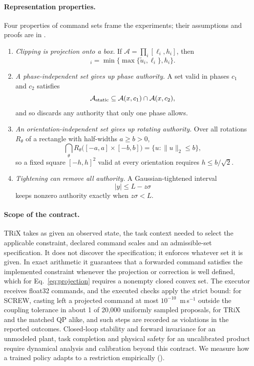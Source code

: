 \documentclass[12pt]{article}
\begin{document}
\paragraph{Representation properties.} Four properties of command sets frame
the experiments; their assumptions and proofs are in .
\begin{enumerate}[label=(\roman*),leftmargin=*,itemsep=2pt]
\item \emph{Clipping is projection onto a box.} If $\mathcal A=\prod_i[\ell_i,h_i]$, then
\begin{equation}
[\Pi_{\mathcal A}(\tilde u)]_i=\min\{\max\{\tilde u_i,\ell_i\},h_i\}.
\label{eq:clip}
\end{equation}
\item \emph{A phase-independent set gives up phase authority.} A set valid in
phases $c_1$ and $c_2$ satisfies
\begin{equation}
\mathcal A_{\rm static}\subseteq\mathcal A(x,c_1)\cap\mathcal A(x,c_2),
\label{eq:phase}
\end{equation}
and so discards any authority that only one phase allows.
\item \emph{An orientation-independent set gives up rotating authority.} Over
all rotations $R_\theta$ of a rectangle with half-widths $a\geq b>0$,
\begin{equation}
\bigcap_{\theta}R_\theta\bigl([-a,a]\times[-b,b]\bigr)=\{u:\|u\|_2\leq b\},
\label{eq:rotation}
\end{equation}
so a fixed square $[-h,h]^2$ valid at every orientation requires
$h\leq b/\sqrt2$.
\item \emph{Tightening can remove all authority.} A Gaussian-tightened interval
\begin{equation}
|y|\leq L-z\sigma
\label{eq:tighten}
\end{equation}
keeps nonzero authority exactly when $z\sigma<L$.
\end{enumerate}

\paragraph{Scope of the contract.} TRiX takes as given an observed state, the
task context needed to select the applicable constraint, declared command
scales and an admissible-set specification. It does not discover the
specification; it enforces whatever set it is given. In exact arithmetic it
guarantees that a forwarded command satisfies the implemented constraint whenever
the projection or correction is well defined, which for Eq.~\eqref{eq:projection}
requires a nonempty closed convex set. The executor
receives float32 commands, and the executed checks apply the strict bound: for
SCREW, casting left a projected command at most $10^{-10}$~m\,s$^{-1}$ outside
the coupling tolerance in about 1 of 20,000 uniformly sampled proposals, for TRiX
and the matched QP alike, and such steps are recorded as violations in the
reported outcomes. Closed-loop stability and forward invariance for an
unmodeled plant, task completion and physical safety for an uncalibrated
product require dynamical analysis and calibration beyond this contract. We measure
how a trained policy adapts to a restriction empirically ().
\end{document}
